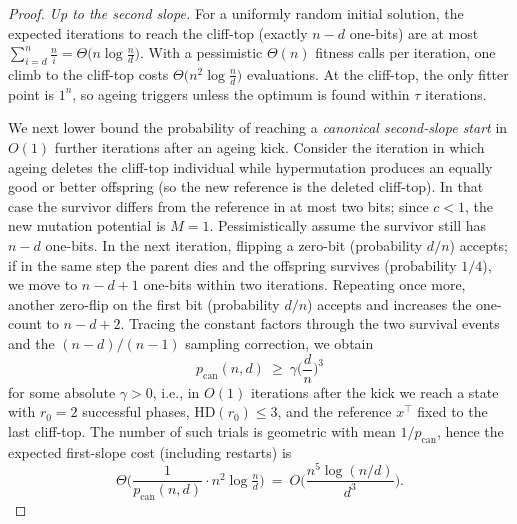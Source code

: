 \documentclass[lettersize,journal]{IEEEtran}
\newcommand{\HD}{\text{HD}}
\begin{document}
\begin{proof}
	\emph{Up to the second slope.}
	For a uniformly random initial solution, the expected iterations to reach the cliff-top (exactly $n-d$ one-bits) are at most
	$\sum_{i=d}^{n}\frac{n}{i}=\Theta\!\big(n\log\frac{n}{d}\big)$.
	With a pessimistic $\Theta(n)$ fitness calls per iteration, one climb to the cliff-top costs $\Theta\!\big(n^{2}\log\frac{n}{d}\big)$ evaluations.
	At the cliff-top, the only fitter point is $1^n$, so ageing triggers unless the optimum is found within $\tau$ iterations.
	
	We next lower bound the probability of reaching a \emph{canonical second-slope start} in $O(1)$ further iterations after an ageing kick.
	Consider the iteration in which ageing deletes the cliff-top individual while hypermutation produces an equally good or better offspring (so the new reference is the deleted cliff-top).
	In that case the survivor differs from the reference in at most two bits; since $c<1$, the new mutation potential is $M=1$.
	Pessimistically assume the survivor still has $n-d$ one-bits.
	In the next iteration, flipping a zero-bit (probability $d/n$) accepts; if in the same step the parent dies and the offspring survives (probability $1/4$), we move to $n-d+1$ one-bits within two iterations.
	Repeating once more, another zero-flip on the first bit (probability $d/n$) accepts and increases the one-count to $n-d+2$.
	Tracing the constant factors through the two survival events and the $(n-d)/(n-1)$ sampling correction, we obtain
	\[
	p_{\mathrm{can}}(n,d)\ \ge\ \gamma\Big(\frac{d}{n}\Big)^{3}
	\]
	for some absolute $\gamma>0$, i.e., in $O(1)$ iterations after the kick we reach a state with $r_0=2$ successful phases, $\HD(r_0)\le 3$, and the reference $x^\top$ fixed to the last cliff-top.
	The number of such trials is geometric with mean $1/p_{\mathrm{can}}$, hence the expected first-slope cost (including restarts) is
	\[
	\Theta\!\Big(\frac{1}{p_{\mathrm{can}}(n,d)}\cdot n^{2}\log\tfrac{n}{d}\Big)
	\ =\ O\!\Big(\frac{n^{5}\log(n/d)}{d^{3}}\Big).
	\]
	

\end{proof}
\end{document}
